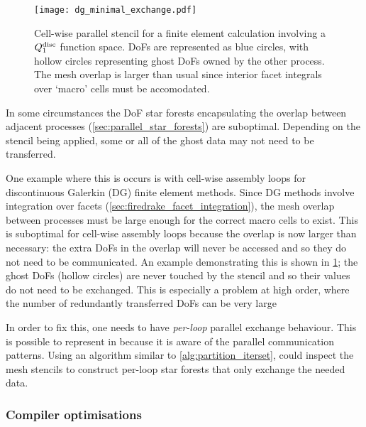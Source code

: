 \documentclass[thesis]{subfiles}
\begin{document}
\begin{figure}
  \centering
  \texttt{[image: dg\_minimal\_exchange.pdf]}
  \caption{
    Cell-wise parallel stencil for a finite element calculation involving a $Q_1^{\textnormal{disc}}$ function space.
    DoFs are represented as blue circles, with hollow circles representing ghost DoFs owned by the other process.
    The mesh overlap is larger than usual since interior facet integrals over `macro' cells must be accomodated.
  }
  \label{fig:dg_minimal_exchange}
\end{figure}

In some circumstances the DoF star forests encapsulating the overlap between adjacent processes (\cref{sec:parallel_star_forests}) are suboptimal.
Depending on the stencil being applied, some or all of the ghost data may not need to be transferred.

One example where this is occurs is with cell-wise assembly loops for discontinuous Galerkin (DG) finite element methods.
Since DG methods involve integration over facets (\cref{sec:firedrake_facet_integration}), the mesh overlap between processes must be large enough for the correct macro cells to exist.
This is suboptimal for cell-wise assembly loops because the overlap is now larger than necessary: the extra DoFs in the overlap will never be accessed and so they do not need to be communicated.
An example demonstrating this is shown in \cref{fig:dg_minimal_exchange}; the ghost DoFs (hollow circles) are never touched by the stencil and so their values do not need to be exchanged.
This is especially a problem at high order, where the number of redundantly transferred DoFs can be very large

In order to fix this, one needs to have \emph{per-loop} parallel exchange behaviour.
This is possible to represent in  because it is aware of the parallel communication patterns.
Using an algorithm similar to \cref{alg:partition_iterset},  could inspect the mesh stencils to construct per-loop star forests that only exchange the needed data.

\subsubsection{Compiler optimisations}
\end{document}
